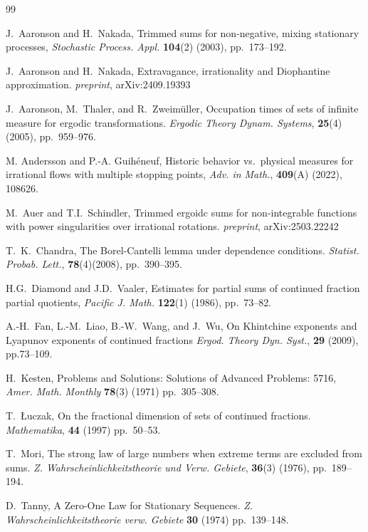 \documentclass[11pt]{amsart}
\theoremstyle{definition}
\numberwithin{equation}{section}
\begin{document}
\begin{thebibliography}{99}

J.~Aaronson and H.~Nakada, 
Trimmed sums for non-negative, mixing stationary processes, 
\textit{Stochastic Process. Appl.} \textbf{104}(2) (2003), pp.~173--192.



J.~Aaronson and H.~Nakada,
Extravagance, irrationality and Diophantine approximation.
\textit{preprint}, arXiv:2409.19393

J.~Aaronson, M.~Thaler, and R.~Zweimüller, Occupation times of sets of infinite measure for ergodic transformations. 
\textit{Ergodic Theory Dynam. Systems},
\textbf{25}(4) (2005), pp.~959--976.

M. Andersson and P.-A. Guih\'eneuf, Historic behavior vs.\ physical measures for irrational flows with multiple stopping points, \textit{Adv. in Math.}, 
\textbf{409}(A) (2022), 108626.

M.~Auer and T.I.~Schindler,
Trimmed ergoidc sums for non-integrable functions with power singularities over irrational rotations.
\textit{preprint}, arXiv:2503.22242

T.~K.~Chandra,
The Borel-Cantelli lemma under dependence conditions.
\textit{Statist. Probab. Lett.}, \textbf{78}(4)(2008), pp.~390--395.

H.G.~Diamond and J.D.~Vaaler, 
Estimates for partial sums of continued fraction partial quotients,
\textit{Pacific J. Math.} \textbf{122}(1) (1986), pp.~73--82.


A.-H.~Fan, L.-M.~Liao, B.-W.~Wang, and J.~Wu,
On Khintchine exponents and Lyapunov
exponents of continued fractions
\textit{Ergod. Theory Dyn. Syst.}, \textbf{29} (2009), pp.73--109. 


H.~Kesten,
 Problems and Solutions: Solutions of Advanced Problems: 5716,
\textit{Amer. Math. Monthly} \textbf{78}(3) (1971) pp.~305--308.

T.~{\L}uczak, 
On the fractional dimension of sets of continued fractions. \textit{Mathematika}, \textbf{44}  (1997) pp.~50--53.

T.~Mori, 
The strong law of large numbers when extreme terms are excluded from sums. 
\textit{Z. Wahrscheinlichkeitstheorie und Verw. Gebiete}, \textbf{36}(3) (1976), pp.~189--194.


D.~Tanny,
A Zero-One Law for Stationary Sequences.
\textit{Z. Wahrscheinlichkeitstheorie verw. Gebiete} \textbf{30} (1974) pp.~139--148.


 

\end{thebibliography}
\end{document}
